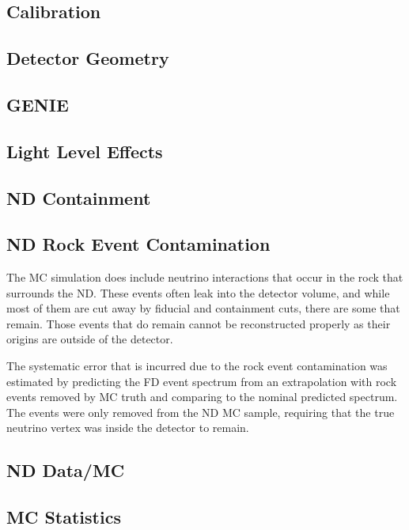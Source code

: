 \subsection{Calibration}

\subsection{Detector Geometry}

\subsection{GENIE}

\subsection{Light Level Effects}

\subsection{ND Containment}

\subsection{ND Rock Event Contamination}

The MC simulation does include neutrino interactions that occur in the rock that surrounds the ND. These events often leak into the detector volume, and while most of them are cut away by fiducial and containment cuts, there are some that remain. Those events that do remain cannot be reconstructed properly as their origins are outside of the detector. 

The systematic error that is incurred due to the rock event contamination was estimated by predicting the FD event spectrum from an extrapolation with rock events removed by MC truth and comparing to the nominal predicted spectrum. The events were only removed from the ND MC sample, requiring that the true neutrino vertex was inside the detector to remain.

\subsection{ND Data/MC}

\subsection{MC Statistics}

